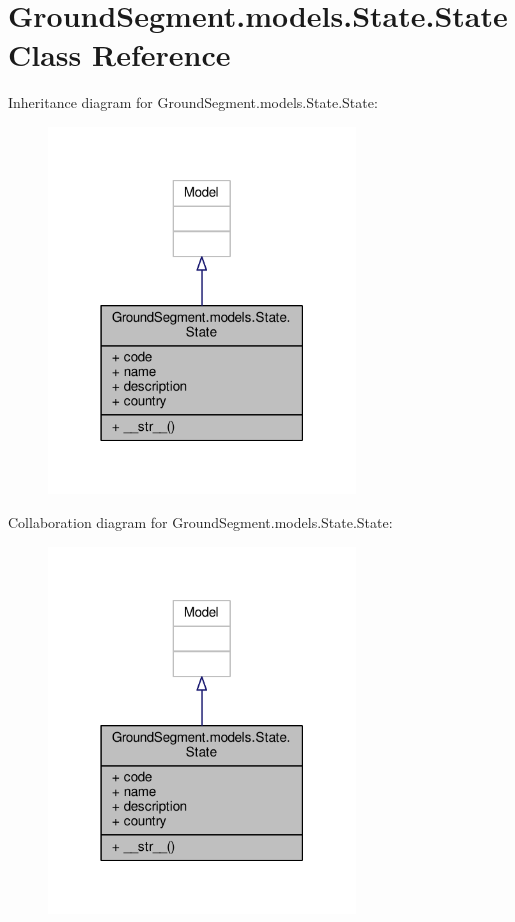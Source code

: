 \hypertarget{class_ground_segment_1_1models_1_1_state_1_1_state}{}\section{Ground\+Segment.\+models.\+State.\+State Class Reference}
\label{class_ground_segment_1_1models_1_1_state_1_1_state}


Inheritance diagram for Ground\+Segment.\+models.\+State.\+State\+:\nopagebreak
\begin{figure}[H]
\begin{center}
\leavevmode
\includegraphics[width=231pt]{class_ground_segment_1_1models_1_1_state_1_1_state__inherit__graph}
\end{center}
\end{figure}


Collaboration diagram for Ground\+Segment.\+models.\+State.\+State\+:\nopagebreak
\begin{figure}[H]
\begin{center}
\leavevmode
\includegraphics[width=231pt]{class_ground_segment_1_1models_1_1_state_1_1_state__coll__graph}
\end{center}
\end{figure}
